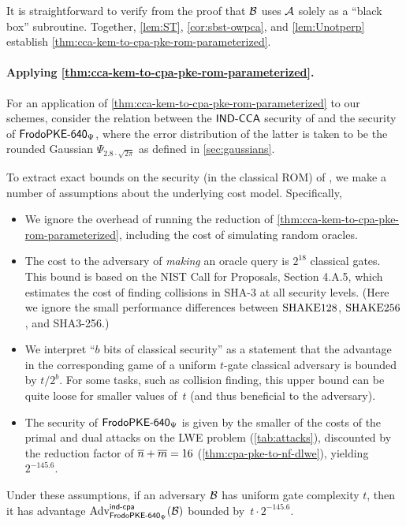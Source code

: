 It is straightforward to verify from the proof that $\mathcal{B}$ uses
$\mathcal{A}$ solely as a ``black box'' subroutine.  Together,
\autoref{lem:ST}, \autoref{cor:sbst-owpca}, and \autoref{lem:Unotperp}
establish \autoref{thm:cca-kem-to-cpa-pke-rom-parameterized}.

\paragraph{Applying \autoref{thm:cca-kem-to-cpa-pke-rom-parameterized}.}
For an application of
\autoref{thm:cca-kem-to-cpa-pke-rom-parameterized} to our schemes,
consider the relation between the $\textsf{\upshape\mdseries IND-CCA}$ security of \FrodoKEMLOne
and the \MINDCPA security of $\textsf{\upshape\mdseries FrodoPKE-640}_\Psi$, where the error
distribution of the latter is taken to be the rounded Gaussian
$\Psi_{2.8\cdot\sqrt{2\pi}}$ as defined in \autoref{sec:gaussians}.

To extract exact bounds on the \MINDCCA security (in the classical ROM)
of \FrodoKEMLOne, we make a number of assumptions about the underlying
cost model. Specifically,
\begin{itemize}
\item We ignore the overhead of running the reduction
  of \autoref{thm:cca-kem-to-cpa-pke-rom-parameterized}, including the
  cost of simulating random oracles.
\item The cost to the adversary of \emph{making} an oracle query is
  $2^{18}$ classical gates. This bound is based on the NIST Call for
  Proposals, Section 4.A.5, which estimates the cost of finding collisions
  in SHA-3 at all security levels. (Here we
  ignore the small performance differences between $\textrm{\upshape\mdseries SHAKE}128$,
  $\textrm{\upshape\mdseries SHAKE}256$, and SHA3-256.)
\item We interpret ``$b$ bits of
  classical security'' as a statement that the advantage in the
  corresponding game of a uniform $t$-gate classical adversary is
  bounded by $t/2^b$. For some tasks, such as collision finding,
  this upper bound can be quite loose for smaller values
  of~$t$ (and thus beneficial to the adversary).
\item The \MINDCPA security of $\textsf{\upshape\mdseries FrodoPKE-640}_\Psi$ is given by the
  smaller of the costs of the primal and dual attacks on the LWE
  problem (\autoref{tab:attacks}), discounted by the reduction factor
  of $\overline{n} + \overline{m}=16$ (\autoref{thm:cpa-pke-to-nf-dlwe}),
  yielding~$2^{-145.6}$.
\end{itemize}

Under these assumptions, if an adversary $\mathcal{B}$ has uniform gate
complexity $t$, then it has advantage
$\mathrm{Adv}^{\textsf{\upshape\mdseries \textsf{\upshape\mdseries ind-cpa}}}_{\textsf{\upshape\mdseries FrodoPKE-640}_\Psi}(\mathcal{B})$ bounded
by~$t\cdot 2^{-145.6}$.

